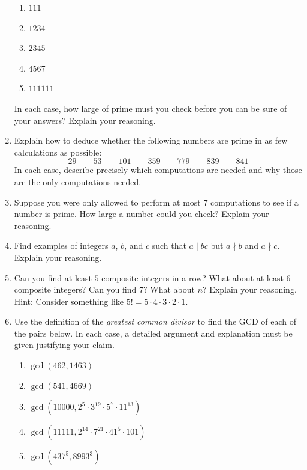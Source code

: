 \begin{problems}
\begin{enumerate}
\begin{enumerate}
\item $111$
\item $1234$
\item $2345$
\item $4567$
\item $111111$
\end{enumerate}
In each case, how large of prime must you check before you can be sure
of your answers? Explain your reasoning.
\item Explain how to deduce whether the following numbers are prime in
  as few calculations as possible:
\[
29 \qquad 53 \qquad 101 \qquad 359 \qquad 779 \qquad 839 \qquad 841
\]
In each case, describe precisely which computations are needed and
why those are the only computations needed.
\item Suppose you were only allowed to perform at most $7$
  computations to see if a number is prime. How large a number could
  you check?  Explain your reasoning.
\item Find examples of integers $a$, $b$, and $c$ such that $a \mid
  bc$ but $a\nmid b$ and $a\nmid c$. Explain your reasoning.
\item Can you find at least $5$ composite integers in a row? What
  about at least $6$ composite integers? Can you find $7$?
  What about $n$?  Explain your reasoning. Hint: Consider something
  like $5! = 5\cdot 4 \cdot 3 \cdot 2 \cdot 1$.
\item Use the definition of the \textit{greatest common divisor} to
  find the GCD of each of the pairs below. In each
  case, a detailed argument and explanation must be given justifying
  your claim.
\begin{enumerate}
\item $\gcd(462,1463)$
\item $\gcd(541,4669)$ 
\item $\gcd(10000,2^5\cdot 3^{19}\cdot 5^7\cdot 11^{13})$
\item $\gcd(11111,2^{14}\cdot 7^{21}\cdot 41^{5}\cdot 101)$
\item $\gcd(437^5,8993^3)$
\end{enumerate}


\end{enumerate}
\end{problems}
